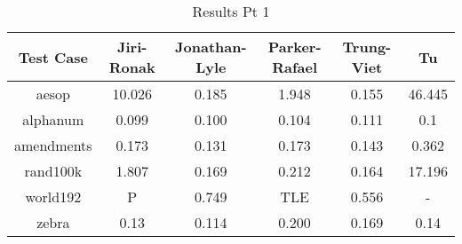 \documentclass[12pt]{article}
\begin{document}
\begin{table}[ht]
\caption{Results Pt 1}%
\centering %
\begin{tabular}{c c c c c c}%
\hline \hline                        %
Test Case & Jiri-Ronak & Jonathan-Lyle & Parker-Rafael & Trung-Viet & Tu \\ [0.5ex]%
\hline                  %
aesop      & 10.026 & 0.185 & 1.948 & 0.155 & 46.445\\
alphanum   & 0.099  & 0.100 & 0.104 & 0.111 & 0.1\\
amendments & 0.173  & 0.131 & 0.173 & 0.143 & 0.362 \\
rand100k   & 1.807  & 0.169 & 0.212 & 0.164 & 17.196\\
world192   & P      & 0.749 & TLE   & 0.556 & -\\
zebra      & 0.13   & 0.114 & 0.200 & 0.169 & 0.14\\
\hline                  %
\end{tabular}
\label{table:nonlin}
\end{table}
\end{document}
